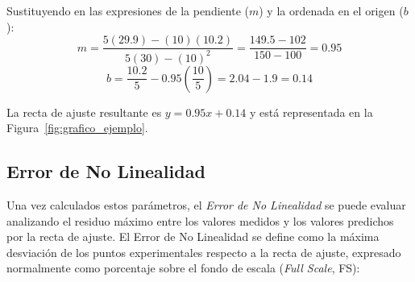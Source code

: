Sustituyendo en las expresiones de la pendiente ($m$) y la ordenada en el origen ($b$):
\begin{equation}
    m = \frac{5(29.9) - (10)(10.2)}{5(30) - (10)^2} = \frac{149.5 - 102}{150 - 100} = 0.95
\end{equation}
\begin{equation}
    b = \frac{10.2}{5} - 0.95\left(\frac{10}{5}\right) = 2.04 - 1.9 = 0.14
\end{equation}

La recta de ajuste resultante es \emph{$y = 0.95x + 0.14$} y está representada en la Figura~\ref{fig:grafico_ejemplo}.
\begin{marginfigure}
    \centering
    \caption[Representación de los puntos y la recta de ajuste calculada por el Método de los Mínimos Cuadrados.]{Representación de los puntos y la recta de ajuste calculada por el Método de los Mínimos Cuadrados.}\label{fig:grafico_ejemplo}
\end{marginfigure}

\subsection{Error de No Linealidad}\label{sec:error_no_linealidad}
Una vez calculados estos parámetros, el \emph{Error de No Linealidad}  se puede evaluar analizando el residuo máximo entre los valores medidos y los valores predichos por la recta de ajuste. El Error de No Linealidad se define como la máxima desviación de los puntos experimentales respecto a la recta de ajuste, expresado normalmente como porcentaje sobre el fondo de escala (\textit{Full Scale}, FS):

